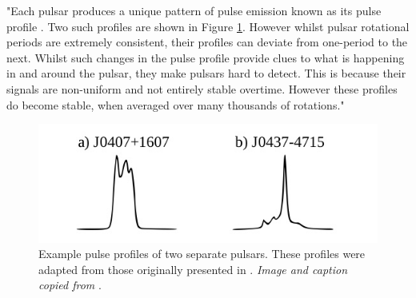 "Each pulsar produces a unique pattern of pulse emission known as its pulse profile \citep{lorimer2008}. Two such profiles are shown in Figure \ref{fig:fig-3}. However whilst pulsar rotational periods are extremely consistent, their profiles can deviate from one-period to the next. Whilst such changes in the pulse profile provide clues to what is happening in and around the pulsar, they make pulsars hard to detect. This is because their signals are non-uniform and not entirely stable overtime. However these profiles do become stable, when averaged over many thousands of rotations."
\begin{figure}[!h]
\centering
\includegraphics[scale=0.4]{figures/fig-3}
\caption[Pulse profiles of two separate pulsars]{Example pulse profiles of two separate pulsars. These profiles were adapted from those originally presented in \citep{lorimer}.  \textit{Image and caption copied from} \citep{lyon}.}	
\label{fig:fig-3}
\end{figure}

